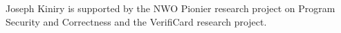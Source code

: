 \documentclass{llncs}
\begin{document}
Joseph Kiniry is supported by the NWO Pionier research project on
Program Security and Correctness and the VerifiCard research project.

%



%
%


\appendix
\end{document}
